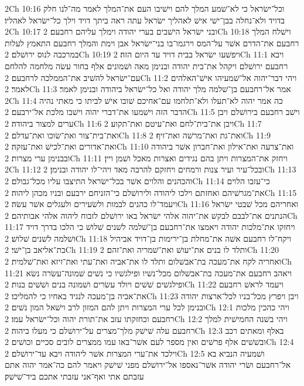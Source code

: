 2Ch 10:16  וכל־ישׂראל כי לא־שׁמע המלך להם וישׁיבו העם את־המלך לאמר מה־לנו חלק בדויד ולא־נחלה בבן־ישׁי אישׁ לאהליך ישׂראל עתה ראה ביתך דויד וילך כל־ישׂראל לאהליו׃
2Ch 10:17  ובני ישׂראל הישׁבים בערי יהודה וימלך עליהם רחבעם׃
2Ch 10:18  וישׁלח המלך רחבעם את־הדרם אשׁר על־המס וירגמו־בו בני־ישׂראל אבן וימת והמלך רחבעם התאמץ לעלות במרכבה לנוס ירושׁלם׃
2Ch 10:19  ויפשׁעו ישׂראל בבית דויד עד היום הזה׃
2Ch 11:1  ויבא רחבעם ירושׁלם ויקהל את־בית יהודה ובנימן מאה ושׁמונים אלף בחור עשׂה מלחמה להלחם עם־ישׂראל להשׁיב את־הממלכה לרחבעם׃
2Ch 11:2  ויהי דבר־יהוה אל־שׁמעיהו אישׁ־האלהים לאמר׃
2Ch 11:3  אמר אל־רחבעם בן־שׁלמה מלך יהודה ואל כל־ישׂראל ביהודה ובנימן לאמר׃
2Ch 11:4  כה אמר יהוה לא־תעלו ולא־תלחמו עם־אחיכם שׁובו אישׁ לביתו כי מאתי נהיה הדבר הזה וישׁמעו את־דברי יהוה וישׁבו מלכת אל־ירבעם׃
2Ch 11:5  וישׁב רחבעם בירושׁלם ויבן ערים למצור ביהודה׃
2Ch 11:6  ויבן את־בית־לחם ואת־עיטם ואת־תקוע׃
2Ch 11:7  ואת־בית־צור ואת־שׂוכו ואת־עדלם׃
2Ch 11:8  ואת־גת ואת־מרשׁה ואת־זיף׃
2Ch 11:9  ואת־אדורים ואת־לכישׁ ואת־עזקה׃
2Ch 11:10  ואת־צרעה ואת־אילון ואת־חברון אשׁר ביהודה ובבנימן ערי מצרות׃
2Ch 11:11  ויחזק את־המצרות ויתן בהם נגידים ואצרות מאכל ושׁמן ויין׃
2Ch 11:12  ובכל־עיר ועיר צנות ורמחים ויחזקם להרבה מאד ויהי־לו יהודה ובנימן׃
2Ch 11:13  והכהנים והלוים אשׁר בכל־ישׂראל התיצבו עליו מכל־גבולם׃
2Ch 11:14  כי־עזבו הלוים את־מגרשׁיהם ואחזתם וילכו ליהודה ולירושׁלם כי־הזניחם ירבעם ובניו מכהן ליהוה׃
2Ch 11:15  ויעמד־לו כהנים לבמות ולשׂעירים ולעגלים אשׁר עשׂה׃
2Ch 11:16  ואחריהם מכל שׁבטי ישׂראל הנתנים את־לבבם לבקשׁ את־יהוה אלהי ישׂראל באו ירושׁלם לזבוח ליהוה אלהי אבותיהם׃
2Ch 11:17  ויחזקו את־מלכות יהודה ויאמצו את־רחבעם בן־שׁלמה לשׁנים שׁלושׁ כי הלכו בדרך דויד ושׁלמה לשׁנים שׁלושׁ׃
2Ch 11:18  ויקח־לו רחבעם אשׁה את־מחלת בן־ירימות בן־דויד אביהיל בת־אליאב בן־ישׁי׃
2Ch 11:19  ותלד לו בנים את־יעושׁ ואת־שׁמריה ואת־זהם׃
2Ch 11:20  ואחריה לקח את־מעכה בת־אבשׁלום ותלד לו את־אביה ואת־עתי ואת־זיזא ואת־שׁלמית׃
2Ch 11:21  ויאהב רחבעם את־מעכה בת־אבשׁלום מכל־נשׁיו ופילגשׁיו כי נשׁים שׁמונה־עשׂרה נשׂא ופילגשׁים שׁשׁים ויולד עשׂרים ושׁמונה בנים ושׁשׁים בנות׃
2Ch 11:22  ויעמד לראשׁ רחבעם את־אביה בן־מעכה לנגיד באחיו כי להמליכו׃
2Ch 11:23  ויבן ויפרץ מכל־בניו לכל־ארצות יהודה ובנימן לכל ערי המצרות ויתן להם המזון לרב וישׁאל המון נשׁים׃
2Ch 12:1  ויהי כהכין מלכות רחבעם וכחזקתו עזב את־תורת יהוה וכל־ישׂראל עמו׃
2Ch 12:2  ויהי בשׁנה החמישׁית למלך רחבעם עלה שׁישׁק מלך־מצרים על־ירושׁלם כי מעלו ביהוה׃
2Ch 12:3  באלף ומאתים רכב ובשׁשׁים אלף פרשׁים ואין מספר לעם אשׁר־באו עמו ממצרים לובים סכיים וכושׁים׃
2Ch 12:4  וילכד את־ערי המצרות אשׁר ליהודה ויבא עד־ירושׁלם׃
2Ch 12:5  ושׁמעיה הנביא בא אל־רחבעם ושׂרי יהודה אשׁר־נאספו אל־ירושׁלם מפני שׁישׁק ויאמר להם כה־אמר יהוה אתם עזבתם אתי ואף־אני עזבתי אתכם ביד־שׁישׁק׃
